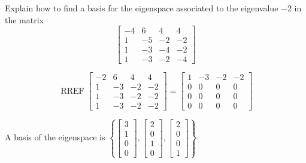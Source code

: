 
\begin{exerciseStatement}


Explain how to find a basis for the eigenspace associated to the eigenvalue \( -2 \) in the matrix \[ \left[\begin{array}{cccc}
-4 & 6 & 4 & 4 \\
1 & -5 & -2 & -2 \\
1 & -3 & -4 & -2 \\
1 & -3 & -2 & -4
\end{array}\right] \]


\end{exerciseStatement}
    
\begin{exerciseAnswer} 


\[\operatorname{RREF} \left[\begin{array}{cccc}
-2 & 6 & 4 & 4 \\
1 & -3 & -2 & -2 \\
1 & -3 & -2 & -2 \\
1 & -3 & -2 & -2
\end{array}\right] = \left[\begin{array}{cccc}
1 & -3 & -2 & -2 \\
0 & 0 & 0 & 0 \\
0 & 0 & 0 & 0 \\
0 & 0 & 0 & 0
\end{array}\right] \]



A basis of the eigenspace is \( \left\{ \left[\begin{array}{c}
3 \\
1 \\
0 \\
0
\end{array}\right] , \left[\begin{array}{c}
2 \\
0 \\
1 \\
0
\end{array}\right] , \left[\begin{array}{c}
2 \\
0 \\
0 \\
1
\end{array}\right] \right\} \).


\end{exerciseAnswer}
    
